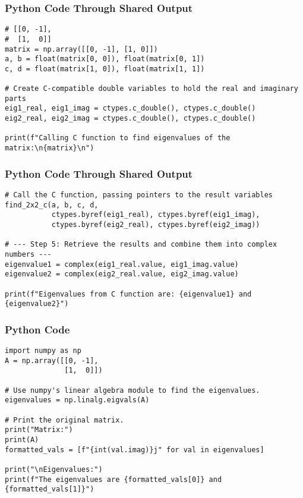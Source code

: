\documentclass{beamer}
\begin{document}
\begin{frame}[fragile]
\frametitle{Python Code Through Shared Output}
\begin{lstlisting}
# [[0, -1],
#  [1,  0]]
matrix = np.array([[0, -1], [1, 0]])
a, b = float(matrix[0, 0]), float(matrix[0, 1])
c, d = float(matrix[1, 0]), float(matrix[1, 1])

# Create C-compatible double variables to hold the real and imaginary parts
eig1_real, eig1_imag = ctypes.c_double(), ctypes.c_double()
eig2_real, eig2_imag = ctypes.c_double(), ctypes.c_double()

print(f"Calling C function to find eigenvalues of the matrix:\n{matrix}\n")
\end{lstlisting}
\end{frame}
\begin{frame}[fragile]
\frametitle{Python Code Through Shared Output}
\begin{lstlisting}
# Call the C function, passing pointers to the result variables
find_2x2_c(a, b, c, d,
           ctypes.byref(eig1_real), ctypes.byref(eig1_imag),
           ctypes.byref(eig2_real), ctypes.byref(eig2_imag))

# --- Step 5: Retrieve the results and combine them into complex numbers ---
eigenvalue1 = complex(eig1_real.value, eig1_imag.value)
eigenvalue2 = complex(eig2_real.value, eig2_imag.value)

print(f"Eigenvalues from C function are: {eigenvalue1} and {eigenvalue2}")
\end{lstlisting}
\end{frame}
\begin{frame}[fragile]
\frametitle{Python Code}
\begin{lstlisting}
import numpy as np
A = np.array([[0, -1],
              [1,  0]])

# Use numpy's linear algebra module to find the eigenvalues.
eigenvalues = np.linalg.eigvals(A)

# Print the original matrix.
print("Matrix:")
print(A)
formatted_vals = [f"{int(val.imag)}j" for val in eigenvalues]

print("\nEigenvalues:")
print(f"The eigenvalues are {formatted_vals[0]} and {formatted_vals[1]}")
\end{lstlisting}
\end{frame}
\end{document}

